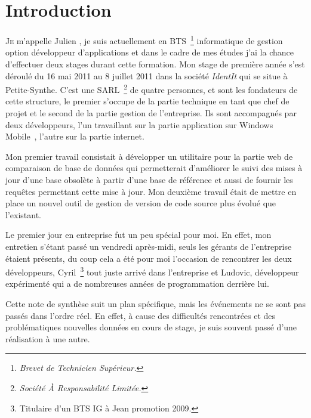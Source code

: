 \chapter{Introduction} %
\label{cha:Introduction}

\lettrine{J}{e} m'appelle Julien , je suis actuellement en
BTS\, \footnote{\emph{Brevet de Technicien Supérieur.}} informatique de
gestion option développeur d'applications et dans le cadre de mes études
j'ai la chance d'effectuer deux stages durant cette formation. Mon stage
de première année s'est déroulé du 16 mai 2011 au 8 juillet 2011 dans la
société \emph{IdentIt} qui se situe à Petite-Synthe. C'est une SARL\,
\footnote{\emph{Société À Responsabilité Limitée.}} de quatre personnes,
 et  sont les fondateurs de cette
structure, le premier s'occupe de la partie technique en tant que chef
de projet et le second de la partie gestion de l'entreprise. Ils sont
accompagnés par deux développeurs, l'un travaillant sur la partie
application sur Windows Mobile~\textregistered, l'autre sur la partie
internet.

Mon premier travail consistait à développer un utilitaire pour la partie
web de comparaison de base de données qui permetterait d'améliorer le
suivi des mises à jour d'une base obsolète à partir d'une base de
référence et aussi de fournir les requêtes permettant cette mise à jour.
Mon deuxième travail était de mettre en place un nouvel outil de gestion
de version de code source plus évolué que l'existant.

Le premier jour en entreprise fut un peu spécial pour moi. En effet, mon
entretien s'étant passé un vendredi après-midi, seuls les gérants de
l'entreprise étaient présents, du coup cela a été pour moi l'occasion de
rencontrer les deux développeurs, Cyril\, \footnote{Titulaire d'un BTS
IG à Jean  promotion 2009.} tout juste arrivé dans
l'entreprise et Ludovic, développeur expérimenté qui a de nombreuses
années de programmation derrière lui.

Cette note de synthèse suit un plan spécifique, mais les événements ne
se sont pas passés dans l'ordre réel. En effet, à cause des difficultés
rencontrées et des problématiques nouvelles données en cours de stage,
je suis souvent passé d'une réalisation à une autre.
